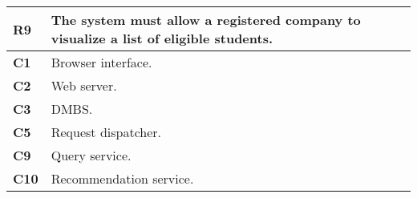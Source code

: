 \begin{table}[H]
    \centering
    \begin{tabular}{|l|m{10cm}|}
        \hline \textbf{R9} & The system must allow a registered company to visualize a list of eligible students.\\
        \hline \textbf{C1} & Browser interface. \\
        \hline \textbf{C2} & Web server. \\
        \hline \textbf{C3} & DMBS. \\
        \hline \textbf{C5} & Request dispatcher. \\
        \hline \textbf{C9} & Query service. \\
        \hline \textbf{C10} & Recommendation service. \\
        \hline
    \end{tabular}
\end{table}

